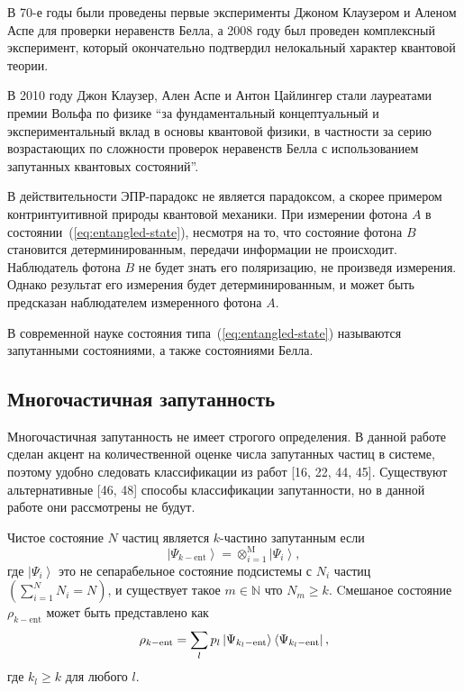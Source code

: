 В 70-е годы были проведены первые эксперименты\cite{Alain1976} Джоном Клаузером и Аленом Аспе для проверки неравенств Белла, 
а 2008 году был проведен комплексный эксперимент\cite{Scheidl2010}, 
который окончательно подтвердил нелокальный характер квантовой теории. 

В 2010 году Джон Клаузер, Ален Аспе и Антон Цайлингер стали лауреатами премии Вольфа по физике ``за фундаментальный концептуальный и экспериментальный вклад в основы квантовой физики, в частности за серию возрастающих по сложности проверок неравенств Белла с использованием запутанных квантовых состояний''.  

В действительности  ЭПР-парадокс не является парадоксом,
а скорее примером контринтуитивной природы квантовой механики. 
При измерении фотона $A$ в состоянии~(\ref{eq:entangled-state}), 
несмотря на то, что состояние фотона $B$ становится детерминированным, 
передачи информации не происходит. 
Наблюдатель фотона $B$ не будет знать его поляризацию, 
не произведя измерения.
Однако результат его измерения будет детерминированным, 
и может быть предсказан наблюдателем измеренного фотона $A$. 

В современной науке состояния типа~(\ref{eq:entangled-state}) называются запутанными состояниями, а также состояниями Белла.  


\subsection{Многочастичная запутанность}

Многочастичная запутанность не имеет строгого определения.
В данной работе сделан акцент на количественной оценке числа запутанных частиц в системе, 
поэтому удобно следовать классификации из работ [16, 22, 44, 45]. 
Существуют альтернативные [46, 48] способы классификации запутанности, 
но в данной работе они рассмотрены не будут. 

\begin{definition}\label{def:manyparticle-entanglement}
  Чистое состояние $N$ частиц является $k$-частино запутанным если
  $$
  \left| \Psi_{k-\mathrm{ent}} \right\rangle
  	= \otimes^\mathrm{M}_{i=1} \left| \Psi_{i} \right\rangle,
  $$
  где $\left| \Psi_{i} \right\rangle$ это не сепарабельное состояние подсистемы с $N_i$ частиц
  $\left( \sum_{i=1}^N N_i = N \right)$, 
  и существует такое  $ m \in \mathbb{N}$ что $N_{m} \ge k$.
  Cмешаное состояние $\rho_{k-\mathrm{ent}}$ может быть представлено как 
  $$
  \rho_{k-\mathrm{ent}} = 
  \sum\limits_{l} p_l \left| \Psi_{k_l-\mathrm{ent}} \right\rangle\left\langle \Psi_{k_l-\mathrm{ent}} \right|, 
  $$
  где $k_l \geq k$ для любого $l$. 
\end{definition}



